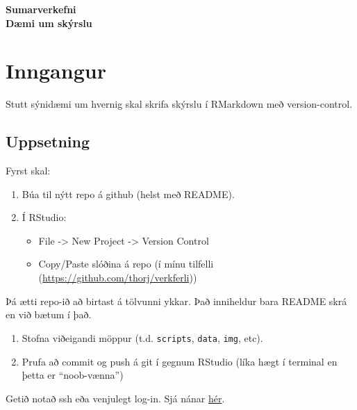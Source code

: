 \documentclass[10pt,]{article}
\author{}
\date{\vspace{-2.5em}}
\begin{document}
\begin{center}
\LARGE{\textbf{Sumarverkefni}}\\
\vspace*{2\baselineskip}
\Large{\textbf{Dæmi um skýrslu}}
\end{center}
\thispagestyle{empty}
\newpage

\hypertarget{inngangur}{%
\section{Inngangur}\label{inngangur}}

Stutt sýnidæmi um hvernig skal skrifa skýrslu í RMarkdown með version-control.

\hypertarget{uppsetning}{%
\subsection{Uppsetning}\label{uppsetning}}

Fyrst skal:

\begin{enumerate}
\def\labelenumi{\arabic{enumi}.}
\item
  Búa til nýtt repo á github (helst með README).
\item
  Í RStudio:

  \begin{itemize}
  \item
    File -\textgreater{} New Project -\textgreater{} Version Control
  \item
    Copy/Paste slóðina á repo (í mínu tilfelli (\url{https://github.com/thorj/verkferli}))
  \end{itemize}
\end{enumerate}

Þá ætti repo-ið að birtast á tölvunni ykkar. Það inniheldur bara README skrá en við bætum í það.

\begin{enumerate}
\def\labelenumi{\arabic{enumi}.}
\setcounter{enumi}{2}
\item
  Stofna viðeigandi möppur (t.d. \texttt{scripts}, \texttt{data}, \texttt{img}, etc).
\item
  Prufa að commit og push á git í gegnum RStudio (líka hægt í terminal en þetta er ``noob-vænna'')
\end{enumerate}

Getið notað ssh eða venjulegt log-in. Sjá nánar \href{https://happygitwithr.com/}{hér}.
\end{document}
